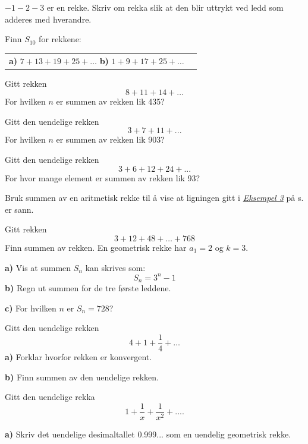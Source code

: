 $ -1-2-3 $ er en rekke. Skriv om rekka slik at den blir uttrykt ved ledd som adderes med hverandre. 

Finn $ S_{10} $ for rekkene:\os
\begin{tabular}{@{}l l}	
	\textbf{a)} $ 7+13+19+25+\ldots $\quad
	\textbf{b)} $ 1+9+17+25+\ldots $
\end{tabular} \os

Gitt rekken 
\[ 8+11+14+\ldots \]
For hvilken $ n $ er summen av rekken lik 435?

Gitt den uendelige rekken
\[ 3+7+11+... \] 
For hvilken $ n $ er summen av rekken lik 903?

Gitt den uendelige rekken
\[ 3+6+12+24+... \]	
For hvor mange element er summen av rekken lik 93?

Bruk summen av en aritmetisk rekke til å vise at ligningen gitt i \hyperref[prodind]{\textsl{Eksempel 3}} på s. \pageref{prodind} er sann.

Gitt rekken
\[ 3+12+48+\ldots+768 \]
Finn summen av rekken. 
\newpage
{}
En geometrisk rekke har $ {a_1 = 2} $ og $ {k=3} $.\os 

\textbf{a)} Vis at summen $ S_n $ kan skrives som:
\[ S_n = 3^n-1 \]
\textbf{b)} Regn ut summen for de tre første leddene.\os

\textbf{c)} For hvilken $ n $ er $ S_n=728 $?

Gitt den uendelige rekken
\[ 4+1+\frac{1}{4}+\ldots \]
\textbf{a)} Forklar hvorfor rekken er konvergent.\os

\textbf{b)} Finn summen av den uendelige rekken.

Gitt den uendelige rekka 
\[ 1+\frac{1}{x}+\frac{1}{x^2}+.... \]

\newpage
{}
\textbf{a)} Skriv det uendelige desimaltallet 0.999... som en uendelig geometrisk rekke.\os

